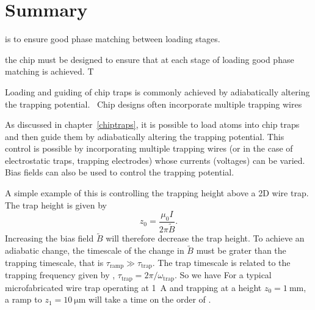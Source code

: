 \section{Summary}


 is to ensure good phase matching
between loading stages.


 the chip must be designed to ensure that at each stage
of loading good phase matching is achieved. T





Loading and guiding of chip traps is commonly achieved by adiabatically
altering the trapping potential.~\cite{} Chip designs often incorporate
multiple trapping wires

As discussed in chapter~\ref{chiptraps}, it is possible to load atoms into
chip traps and then guide them by adiabatically altering the trapping
potential.  This control is possible by
incorporating multiple trapping wires (or in the case of electrostatic traps,
trapping electrodes) whose currents (voltages) can be 
varied. Bias fields can also be used to control the trapping potential.

A simple example of this is controlling the trapping height above a 2D wire
trap. The trap height is given by 
%
\begin{equation}
z_0 = \frac{\mu_0I}{2\pi \tilde{B}}.
\end{equation}
%
Increasing the bias field $\tilde{B}$ will therefore decrease the trap height.
To achieve an adiabatic change, the timescale of the change in $\tilde{B}$ must
be grater than the trapping timescale, that is $\tau_\text{ramp} \gg
\tau_\text{trap}$. The trap timescale is related to the trapping frequency
given by , $\tau_\text{trap} = 2\pi / \omega_\text{trap}$. So
we have
%
%
For a typical microfabricated wire trap operating at \SI{1}{\ampere} and trapping
at a height $z_0 = \SI{1}{\milli\meter}$, a ramp to $z_1 =
\SI{10}{\micro\meter}$ will take a time on the order of .


